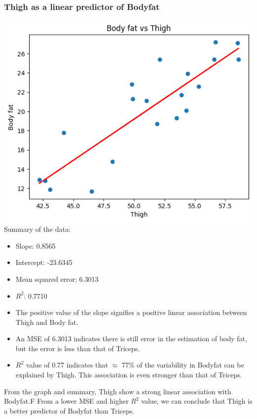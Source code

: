 \documentclass[12pt]{article}
\begin{document}
\subsubsection*{Thigh as a linear predictor of Bodyfat}
\includegraphics*[width=\linewidth]{graph4b2}
Summary of the data:
\begin{itemize}
    \item Slope: 0.8565
    \item Intercept: -23.6345
    \item Mean squared error: 6.3013
    \item \(R^2\): 0.7710
    \item The positive value of the slope signifies a positive linear
    association between Thigh and Body fat.
    \item An MSE of 6.3013 indicates there is still error in the estimation
    of body fat, but the error is less than that of Triceps.
    \item \(R^2\) value of 0.77 indicates that \(\approx\) 77\% of the variability
    in Bodyfat can be explained by Thigh. This association is even stronger than
    that of Triceps.
\end{itemize}
From the graph and summary, Thigh show a strong linear association with Bodyfat.F
From a lower MSE and higher \(R^2\) value, we can conclude that Thigh is a better
predictor of Bodyfat than Triceps.

\newpage
\end{document}

